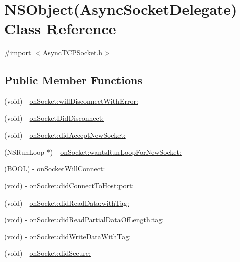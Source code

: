 \hypertarget{interface_n_s_object_07_async_socket_delegate_08}{
\section{NSObject(AsyncSocketDelegate) Class Reference}
\label{interface_n_s_object_07_async_socket_delegate_08}
}


{\ttfamily \#import $<$AsyncTCPSocket.h$>$}

\subsection*{Public Member Functions}
\begin{DoxyCompactItemize}
\item 
(void) -\/ \hyperlink{interface_n_s_object_07_async_socket_delegate_08_a5d21094e2a90101a6719835d004e000d}{onSocket:willDisconnectWithError:}
\item 
(void) -\/ \hyperlink{interface_n_s_object_07_async_socket_delegate_08_a058e6f19c26861e2b1b9b5dcdc91aebd}{onSocketDidDisconnect:}
\item 
(void) -\/ \hyperlink{interface_n_s_object_07_async_socket_delegate_08_af0db37e6bbfff8d814e569e789e68439}{onSocket:didAcceptNewSocket:}
\item 
(NSRunLoop $\ast$) -\/ \hyperlink{interface_n_s_object_07_async_socket_delegate_08_a36826ecbbd53c65e59095c94a692a021}{onSocket:wantsRunLoopForNewSocket:}
\item 
(BOOL) -\/ \hyperlink{interface_n_s_object_07_async_socket_delegate_08_ae1a8da1303f2068f4f0933eb61b2e121}{onSocketWillConnect:}
\item 
(void) -\/ \hyperlink{interface_n_s_object_07_async_socket_delegate_08_a86ef5d4058eb4382b59e613afea6c06c}{onSocket:didConnectToHost:port:}
\item 
(void) -\/ \hyperlink{interface_n_s_object_07_async_socket_delegate_08_a1dbbd6cfc560bc44072caddcb493e30b}{onSocket:didReadData:withTag:}
\item 
(void) -\/ \hyperlink{interface_n_s_object_07_async_socket_delegate_08_a99ca1be6f4bc8c1162e479c073b8ffb5}{onSocket:didReadPartialDataOfLength:tag:}
\item 
(void) -\/ \hyperlink{interface_n_s_object_07_async_socket_delegate_08_a08341f1521b025a34d2a595cb23a1eb9}{onSocket:didWriteDataWithTag:}
\item 
(void) -\/ \hyperlink{interface_n_s_object_07_async_socket_delegate_08_aad56da2e1f775e8fd17096864dadbe34}{onSocket:didSecure:}
\end{DoxyCompactItemize}


